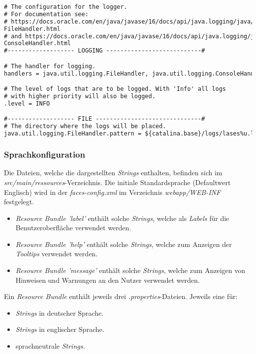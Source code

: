 \begin{lstlisting}[language=XML, caption = Die Loggingkonfiguration \emph{logger.properties}]
# The configuration for the logger.
# For documentation see:
# https://docs.oracle.com/en/java/javase/16/docs/api/java.logging/java/util/logging/
FileHandler.html
# and https://docs.oracle.com/en/java/javase/16/docs/api/java.logging/java/util/logging/
ConsoleHandler.html
#------------------- LOGGING ---------------------------#

# The handler for logging.
handlers = java.util.logging.FileHandler, java.util.logging.ConsoleHandler

# The level of logs that are to be logged. With 'Info' all logs
# with higher priority will also be logged.
.level = INFO

#------------------- FILE ------------------------------#
# The directory where the logs will be placed.
java.util.logging.FileHandler.pattern = ${catalina.base}/logs/lases%u.log
\end{lstlisting}

\subsubsection{Sprachkonfiguration}
Die Dateien, welche die dargestellten \emph{Strings} enthalten, befinden sich im
\emph{src/main/ressources}-Verzeichnis.
Die initiale Standardsprache (Defaultwert Englisch) wird in der \emph{faces-config.xml} im
Verzeichnis \emph{webapp/WEB-INF} festgelegt.

\begin{itemize}
    \item \emph{Resource Bundle 'label'} enthält solche \emph{Strings}, welche als \emph{Labels} für die Benutzeroberfläche verwendet
    werden.
    \item \emph{Resource Bundle 'help'} enthält solche \emph{Strings}, welche zum Anzeigen der \emph{Tooltips} verwendet
    werden.
    \item \emph{Resource Bundle 'message'} enthält solche \emph{Strings}, welche zum Anzeigen von Hinweisen und Warnungen
    an den Nutzer verwendet werden.
\end{itemize}

Ein \emph{Resource Bundle} enthält jeweils drei \emph{.properties}-Dateien.
Jeweils eine für:
\begin{itemize}
    \item \emph{Strings} in deutscher Sprache.
    \item \emph{Strings} in englischer Sprache.
    \item sprachneutrale \emph{Strings}.
\end{itemize}

